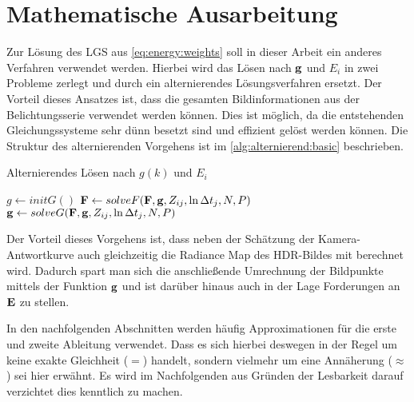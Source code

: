 \chapter{Mathematische Ausarbeitung}
\label{chap:maths}
Zur Lösung des \gls{LGS} aus \autoref{eq:energy:weights} soll in dieser Arbeit ein anderes Verfahren verwendet werden. Hierbei wird das Lösen nach $\b g$ und $E_i$ in zwei Probleme zerlegt und durch ein alternierendes Lösungsverfahren ersetzt. Der Vorteil dieses Ansatzes ist, dass die gesamten Bildinformationen aus der Belichtungsserie verwendet werden können. Dies ist möglich, da die entstehenden Gleichungssysteme sehr dünn besetzt sind und effizient gelöst werden können. Die Struktur des alternierenden Vorgehens ist im \autoref{alg:alternierend:basic} beschrieben.

\begin{Algorithmus} %
\caption{Alternierendes Lösen nach $g(k)$ und $E_i$}
\label{alg:alternierend:basic}
\begin{algorithmic}
	\State $g \gets initG()$
		\State $\mathbf F \gets solveF(\mathbf F, \mathbf g, Z_{ij}, \ln \Delta t_j, N, P)$ 
		\State $\mathbf g \gets solveG(\mathbf F, \mathbf g, Z_{ij}, \ln \Delta t_j, N, P)$
	\EndWhile
	\State \Return [$\b g$, $\b F$]
\EndFunction
\end{algorithmic}
\end{Algorithmus}

Der Vorteil dieses Vorgehens ist, dass neben der Schätzung der Kamera-Antwortkurve auch gleichzeitig die \gls{Radiance Map} des \gls{HDR}-Bildes mit berechnet wird. Dadurch spart man sich die anschließende Umrechnung der Bildpunkte mittels der Funktion $\b g$ und ist darüber hinaus auch in der Lage Forderungen an $\mathbf E$ zu stellen.

In den nachfolgenden Abschnitten werden häufig Approximationen für die erste und zweite Ableitung verwendet. Dass es sich hierbei deswegen in der Regel um keine exakte Gleichheit ($=$) handelt, sondern vielmehr um eine Annäherung ($\approx$) sei hier erwähnt. Es wird im Nachfolgenden aus Gründen der Lesbarkeit darauf verzichtet dies kenntlich zu machen.



